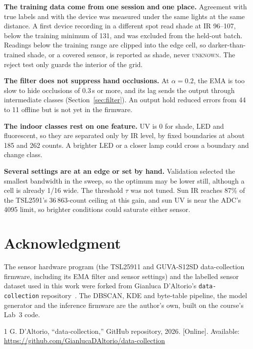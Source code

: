 \documentclass[conference]{IEEEtran}
\begin{document}
\textbf{The training data come from one session and one place.} Agreement with true labels and with the device was measured under the same lights at the same distance. A first device recording in a different spot read shade at IR 96--107, below the training minimum of 131, and was excluded from the held-out batch. Readings below the training range are clipped into the edge cell, so darker-than-trained shade, or a covered sensor, is reported as shade, never \textsc{unknown}. The reject test only guards the interior of the grid.

\textbf{The filter does not suppress hand occlusions.} At $\alpha = 0.2$, the EMA is too slow to hide occlusions of 0.3\,s or more, and its lag sends the output through intermediate classes (Section~\ref{sec:filter}). An output hold reduced errors from 44 to 11 offline but is not yet in the firmware.

\textbf{The indoor classes rest on one feature.} UV is 0 for shade, LED and fluorescent, so they are separated only by IR level, by fixed boundaries at about 185 and 262 counts. A brighter LED or a closer lamp could cross a boundary and change class.

\textbf{Several settings are at an edge or set by hand.} Validation selected the smallest bandwidth in the sweep, so the optimum may be lower still, although a cell is already 1/16 wide. The threshold $\tau$ was not tuned. Sun IR reaches 87\% of the TSL2591's 36\,863-count ceiling at this gain, and sun UV is near the ADC's 4095 limit, so brighter conditions could saturate either sensor.

\section*{Acknowledgment}
The sensor hardware program (the TSL25911 and GUVA-S12SD data-collection firmware, including its EMA filter and sensor settings) and the labelled sensor dataset used in this work were forked from Gianluca D'Altorio's \texttt{data-collection} repository~\cite{peer_repo}. The DBSCAN, KDE and byte-table pipeline, the model generator and the inference firmware are the author's own, built on the course's Lab~3 code.

\begin{thebibliography}{1}
G. D'Altorio, ``data-collection,'' GitHub repository, 2026. [Online]. Available: \url{https://github.com/GianlucaDAltorio/data-collection}
\end{thebibliography}
\end{document}
